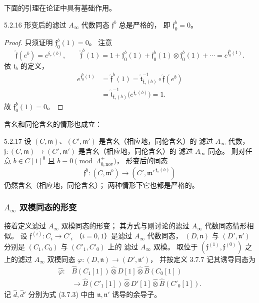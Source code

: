 下面的引理在论证中具有基础作用。

\begin{lemma}{5.2.16}\label{lem:5-2-16}
形变后的滤过 $A_\infty$ 代数同态
$\mathfrak f^b$ 总是严格的，
即 $\mathfrak f^b_0=0$。
\end{lemma}

\begin{proof}
只须证明 $\mathfrak f^b_0(1)=0$。
注意
\[
\widehat{\mathfrak f}(e^b)
=e^{\mathfrak f_*(b)},
\qquad
\widehat{\mathfrak f}^{b}(1)
=1+\mathfrak f^b_0(1)
+\mathfrak f^b_0(1)\otimes\mathfrak f^b_0(1)
+\cdots
=e^{\mathfrak f^b_0(1)}.
\]
依 $\widehat{\mathfrak t}_b$ 的定义，
\[
\begin{aligned}
e^{\mathfrak f^b_0(1)}
&=\widehat{\mathfrak f}^{b}(1)
=\widehat{\mathfrak t}_{\mathfrak f_*(b)}^{-1}
\circ\widehat{\mathfrak f}(e^b)\\
&=\widehat{\mathfrak t}_{\mathfrak f_*(b)}^{-1}
\bigl(e^{\mathfrak f_*(b)}\bigr)=1.
\end{aligned}
\]
故 $\mathfrak f^b_0(1)=0$。
\end{proof}

含幺和同伦含幺的情形也成立：

\begin{lemma}{5.2.17}\label{lem:5-2-17}
设 $(C,\mathfrak m)$、$(C',\mathfrak m')$
是含幺（相应地，同伦含幺）的
滤过 $A_\infty$ 代数，
$\mathfrak f:(C,\mathfrak m)\to(C',\mathfrak m')$
是含幺（相应地，同伦含幺）的
滤过 $A_\infty$ 同态。
则对任意 $b\in C[1]^0$ 且
$b\equiv0\pmod{\Lambda_{0,\mathrm{nov}}^+}$，
形变后的同态
\[
\mathfrak f^b:(C,\mathfrak m^b)
\longrightarrow
(C',\mathfrak m'^{\,\mathfrak f_*(b)})
\]
仍然含幺（相应地，同伦含幺）；
两种情形下它也都是严格的。
\end{lemma}

\subsubsection{\texorpdfstring{$A_\infty$}{A-infinity} 双模同态的形变}
\label{subsubsec:5-2-2-3}

接着定义滤过 $A_\infty$ 双模同态的形变；
其方式与刚讨论的滤过 $A_\infty$ 代数同态情形相似。
设 $\mathfrak f^{(i)}:C_i\to C'_i$
（$i=0,1$）是滤过 $A_\infty$ 代数同态，
$(D,\mathfrak n)$ 与 $(D',\mathfrak n')$
分别是 $(C_1,C_0)$ 与 $(C'_1,C'_0)$ 上的
滤过 $A_\infty$ 双模。
取位于
$(\mathfrak f^{(1)},\mathfrak f^{(0)})$
之上的滤过 $A_\infty$ 双模同态
$\varphi:(D,\mathfrak n)\to(D',\mathfrak n')$，
并按定义 3.7.7 记其诱导同态为
\[
\begin{aligned}
\widehat\varphi:
&\widehat B(C_1[1])\widehat\otimes D[1]
 \widehat\otimes\widehat B(C_0[1])\\
&\longrightarrow
\widehat B(C'_1[1])\widehat\otimes D'[1]
 \widehat\otimes\widehat B(C'_0[1]).
\end{aligned}
\]
记 $\widehat d,\widehat d'$
分别为式 (3.7.3) 中由
$\mathfrak n,\mathfrak n'$ 诱导的余导子。

